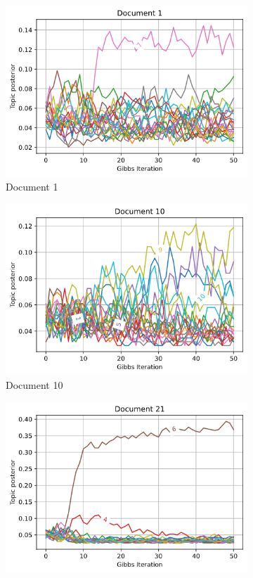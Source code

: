 \documentclass[]{article}
\begin{document}
\begin{figure}[!h]
	\begin{subfigure}{0.33\linewidth}
		\centering
		\includegraphics[width=\linewidth]{lda-topic-post-1.png}
		\caption{Document 1}	
	\end{subfigure}
	\begin{subfigure}{0.33\linewidth}
		\centering
		\includegraphics[width=\linewidth]{lda-topic-post-10.png}
		\caption{Document 10}
	\end{subfigure}
	\begin{subfigure}{0.33\linewidth}
		\centering
		\includegraphics[width=\linewidth]{lda-topic-post-21.png}

\end{subfigure}
\end{figure}
\end{document}
